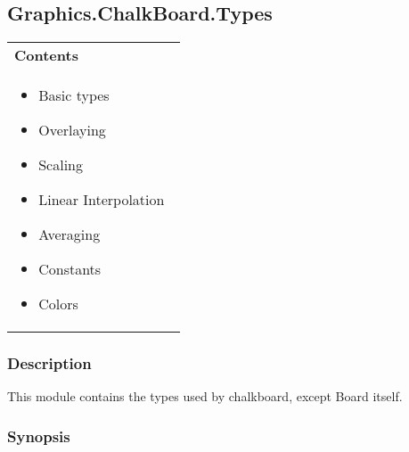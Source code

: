\subsection{Graphics.ChalkBoard.Types}     

         

 

 
\begin{tabular}{p{0.95\linewidth}}{\bf {\bf Contents}}\\ %

 
\begin{itemize}
\setlength{\itemsep}{0in}

\item Basic types
\item Overlaying
\item Scaling
\item Linear Interpolation
\item Averaging
\item Constants
\item Colors
\end{itemize}
\\ %


\end{tabular}


 

\subsubsection{Description}

\hspace{0.05\textwidth}\begin{minipage}{0.9\textwidth}This module contains the types used by chalkboard, except Board itself.\end{minipage}

 

\subsubsection{Synopsis}

 


